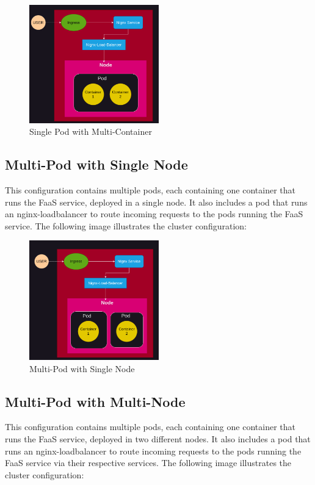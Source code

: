 \documentclass{article}
\begin{document}
\begin{figure}[h]
   \centering
   \includegraphics[width=0.5\textwidth]{../images/one_pod_two_container.png}
   \caption{Single Pod with Multi-Container}
\end{figure}

\subsection{Multi-Pod with Single Node}
This configuration contains multiple pods, each containing one container that runs the FaaS service, deployed in a single node. It also includes a pod that runs an nginx-loadbalancer to route incoming requests to the pods running the FaaS service. The following image illustrates the cluster configuration:

\begin{figure}[h]
   \centering
   \includegraphics[width=0.5\textwidth]{../images/one_node_two_pod.png}
   \caption{Multi-Pod with Single Node}
\end{figure}

\subsection{Multi-Pod with Multi-Node}
This configuration contains multiple pods, each containing one container that runs the FaaS service, deployed in two different nodes. It also includes a pod that runs an nginx-loadbalancer to route incoming requests to the pods running the FaaS service via their respective services. The following image illustrates the cluster configuration:
\end{document}
